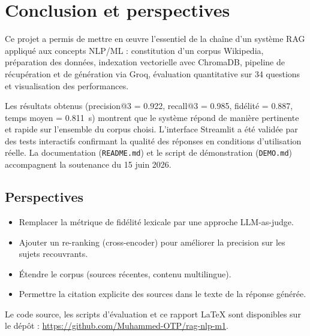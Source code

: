 \section{Conclusion et perspectives}
\label{sec:conclusion}

Ce projet a permis de mettre en \oe uvre l'essentiel de la cha\^ine d'un syst\`eme RAG appliqu\'e
aux concepts NLP/ML : constitution d'un corpus Wikipedia, pr\'eparation des donn\'ees, indexation
vectorielle avec ChromaDB, pipeline de r\'ecup\'eration et de g\'en\'eration via Groq, \'evaluation
quantitative sur 34 questions et visualisation des performances.

Les r\'esultats obtenus (precision@3 = 0.922, recall@3 = 0.985, fid\'elit\'e = 0.887, temps
moyen = 0.811~s) montrent que le syst\`eme r\'epond de mani\`ere pertinente et rapide sur
l'ensemble du corpus choisi. L'interface Streamlit a \'et\'e valid\'ee par des tests interactifs confirmant la qualit\'e
des r\'eponses en conditions d'utilisation r\'eelle. La documentation (\texttt{README.md}) et
le script de d\'emonstration (\texttt{DEMO.md}) accompagnent la soutenance du 15 juin 2026.

\subsection{Perspectives}

\begin{itemize}[noitemsep]
  \item Remplacer la m\'etrique de fid\'elit\'e lexicale par une approche LLM-as-judge.
  \item Ajouter un re-ranking (cross-encoder) pour am\'eliorer la precision sur les sujets
        recouvrants.
  \item \'Etendre le corpus (sources r\'ecentes, contenu multilingue).
  \item Permettre la citation explicite des sources dans le texte de la r\'eponse g\'en\'er\'ee.
\end{itemize}

Le code source, les scripts d'\'evaluation et ce rapport LaTeX sont disponibles sur le d\'ep\^ot :
\url{https://github.com/Muhammed-OTP/rag-nlp-m1}.
